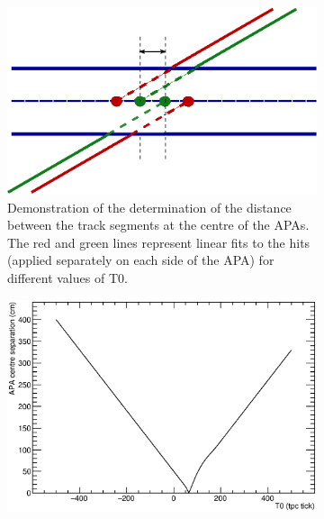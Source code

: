 \begin{figure}[p]
\begin{subfigure}[t]{0.48\linewidth}
    \label{fig:APACrossingAlignmentLeastSqMin}
  \end{subfigure}
  \caption[Method to align track segments on either side of the APAs involving minimising residuals from linear least square fit.]{Method to align track segments on either side of the APAs involving minimising residuals from a linear least square fit.  A fit is applied to all hits and the resulting residual, a representation of the `goodness of fit', is minimised over a range of T0 candidates to find the most likely interaction time for the particle leaving the track.}
  \label{fig:APACrossingAlignmentLeastSq}

  \vspace*{\floatsep}

  \begin{subfigure}[t]{0.48\linewidth}
    \centering
    \includegraphics[width=\textwidth]{track_separation.eps}
    \caption{Demonstration of the determination of the distance between the track segments at the centre of the APAs.  The red and green lines represent linear fits to the hits (applied separately on each side of the APA) for different values of T0.}
    \label{fig:APACrossingAligmentLeastSqSeparation}
  \end{subfigure}
  \hfill
  \begin{subfigure}[t]{0.48\linewidth}
    \centering
    \includegraphics[width=\textwidth]{separation.eps}

\end{subfigure}
\end{figure}

